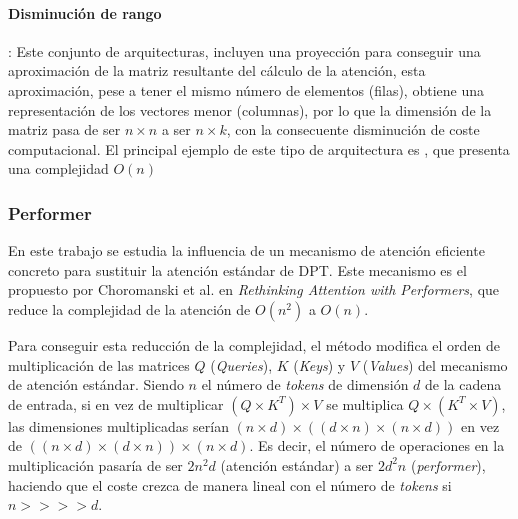 \paragraph{Disminución de rango}:
Este conjunto de arquitecturas, incluyen una proyección para conseguir una aproximación de la matriz resultante del cálculo de la atención, esta aproximación, pese a tener el mismo número de elementos (filas), obtiene una representación de los vectores menor (columnas), por lo que la dimensión de la matriz pasa de ser $n \times n$ a ser $n \times k$, con la consecuente disminución de coste computacional. El principal ejemplo de este tipo de arquitectura es , \cite{wang2020linformer} que presenta una complejidad $O(n)$



\subsubsection{Performer}
En este trabajo se estudia la influencia de un mecanismo de atención eficiente concreto para sustituir la atención estándar de DPT. Este mecanismo es el propuesto por Choromanski et al. en \textit{Rethinking Attention with Performers}\cite{performers}, que reduce la complejidad de la atención de $O(n^2)$ a $O(n)$.

Para conseguir esta reducción de la complejidad, el método modifica el orden de multiplicación de las matrices $Q$ (\textit{Queries}), $K$ (\textit{Keys}) y $V$ (\textit{Values}) del mecanismo de atención estándar. Siendo $n$ el número de \textit{tokens} de dimensión $d$ de la cadena de entrada, si en vez de multiplicar $(Q \times K^T) \times V$ se multiplica $Q \times (K^T \times V)$, las dimensiones multiplicadas serían $(n \times d) \times ((d \times n) \times (n \times d))$ en vez de $((n \times d) \times (d \times n)) \times (n \times d)$. Es decir, el número de operaciones en la multiplicación pasaría de ser $2 n^2 d$ (atención estándar) a ser $2 d^2 n$ (\textit{performer}), haciendo que el coste crezca de manera lineal con el número de \textit{tokens} si $n >>>> d$.

